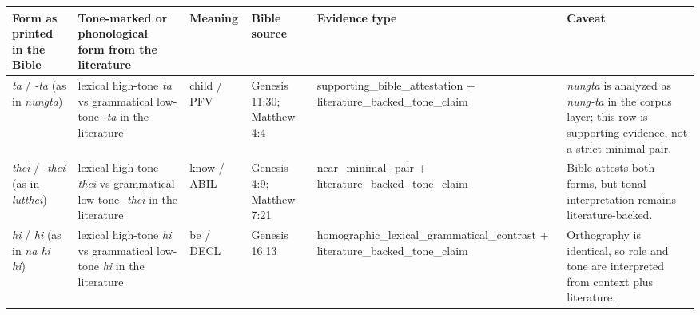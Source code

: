 \documentclass[
  11pt,
  a4paper,
]{article}
\newcounter{none} %
\newcommand{\tdim}[1]{\textit{#1}}
\begin{document}
{\def\LTcaptype{none} %
\begin{longtable}[]{@{}
  >{\raggedright\arraybackslash}p{}
  >{\raggedright\arraybackslash}p{}
  >{\raggedright\arraybackslash}p{}
  >{\raggedright\arraybackslash}p{}
  >{\raggedright\arraybackslash}p{}
  >{\raggedright\arraybackslash}p{}@{}}
\toprule\noalign{}
\begin{minipage}[b]{\linewidth}\raggedright
Form as printed in the Bible
\end{minipage} & \begin{minipage}[b]{\linewidth}\raggedright
Tone-marked or phonological form from the literature
\end{minipage} & \begin{minipage}[b]{\linewidth}\raggedright
Meaning
\end{minipage} & \begin{minipage}[b]{\linewidth}\raggedright
Bible source
\end{minipage} & \begin{minipage}[b]{\linewidth}\raggedright
Evidence type
\end{minipage} & \begin{minipage}[b]{\linewidth}\raggedright
Caveat
\end{minipage} \\
\midrule\noalign{}
\endhead
\bottomrule\noalign{}
\endlastfoot
\tdim{ta} / \tdim{-ta} (as in \tdim{nungta}) & lexical high-tone
\tdim{ta} vs grammatical low-tone \tdim{-ta} in the literature & child /
PFV & Genesis 11:30; Matthew 4:4 & supporting\_bible\_attestation +
literature\_backed\_tone\_claim & \tdim{nungta} is analyzed as
\tdim{nung-ta} in the corpus layer; this row is supporting evidence, not
a strict minimal pair. \\
\tdim{thei} / \tdim{-thei} (as in \tdim{lutthei}) & lexical high-tone
\tdim{thei} vs grammatical low-tone \tdim{-thei} in the literature &
know / ABIL & Genesis 4:9; Matthew 7:21 & near\_minimal\_pair +
literature\_backed\_tone\_claim & Bible attests both forms, but tonal
interpretation remains literature-backed. \\
\tdim{hi} / \tdim{hi} (as in \tdim{na hi hi}) & lexical high-tone
\tdim{hi} vs grammatical low-tone \tdim{hi} in the literature & be /
DECL & Genesis 16:13 & homographic\_lexical\_grammatical\_contrast +
literature\_backed\_tone\_claim & Orthography is identical, so role and
tone are interpreted from context plus literature. \\
\end{longtable}
}
\end{document}
